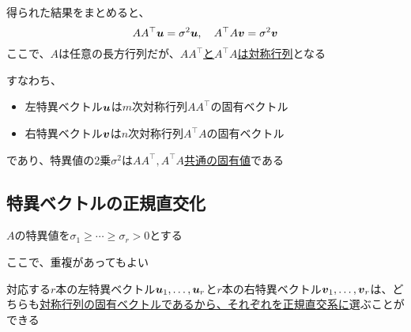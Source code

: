 \documentclass[../../../topic_linear-algebra]{subfiles}
\begin{document}
得られた結果をまとめると、
\begin{equation*}
  A A^\top \vb*{u} = \sigma^2 \vb*{u} , \quad A^\top A \vb*{v} = \sigma^2 \vb*{v}
\end{equation*}
ここで、$A$は任意の長方行列だが、\hyperref[thm:symmetric-products-of-any-matrix]{$A A^\top$と$A^\top A$は対称行列}となる

\br

すなわち、
\begin{itemize}
  \item 左特異ベクトル$\vb*{u}$は$m$次対称行列$A A^\top$の固有ベクトル
  \item 右特異ベクトル$\vb*{v}$は$n$次対称行列$A^\top A$の固有ベクトル
\end{itemize}
であり、特異値の2乗$\sigma^2$は\hyperref[thm:svd-singular-value-vector-correspondence]{$A A^\top, A^\top A$共通の固有値}である

\subsection{特異ベクトルの正規直交化}

$A$の特異値を$\sigma_1 \geq \cdots \geq \sigma_r > 0$とする

ここで、重複があってもよい

\br

対応する$r$本の左特異ベクトル$\vb*{u}_1, \ldots, \vb*{u}_r$と$r$本の右特異ベクトル$\vb*{v}_1, \ldots, \vb*{v}_r$は、どちらも\hyperref[sec:orthogonalization-eigenvectors-symmetric]{対称行列の固有ベクトルであるから、それぞれを正規直交系に}選ぶことができる
\end{document}
